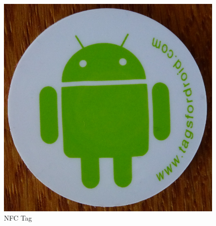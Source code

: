 \documentclass[numbers=noenddot, abstract=on, a4paper, headsepline,
footsepline, oneside, draft=off]{scrreprt}
\begin{document}
\begin{figure}[!htb]
\begin{minipage}{.5\textwidth}
		\includegraphics[height=.2\textheight]{img/nfc_tag}
		\caption{NFC Tag}
		\label{fig:handbook_nfctag}
	\end{minipage}
\end{figure}
\end{document}
